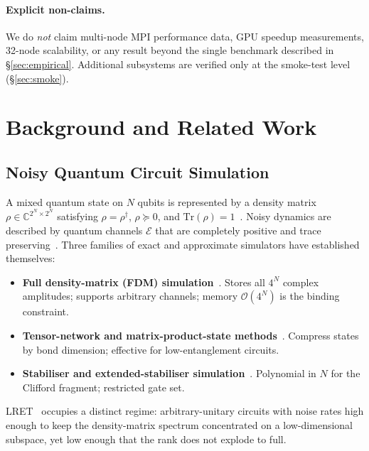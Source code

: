\documentclass[11pt,a4paper]{article}
\begin{document}
\paragraph{Explicit non-claims.}
We do \emph{not} claim multi-node MPI performance data, GPU speedup measurements,
32-node scalability, or any result beyond the single benchmark described in
\S\ref{sec:empirical}. Additional subsystems are verified only at the smoke-test level
(\S\ref{sec:smoke}).

\section{Background and Related Work}
\label{sec:background}

\subsection{Noisy Quantum Circuit Simulation}
\label{sec:bg-sim}

A mixed quantum state on $N$ qubits is represented by a density matrix
$\rho \in \mathbb{C}^{2^N \times 2^N}$ satisfying $\rho = \rho^\dagger$, $\rho \succeq 0$,
and $\mathrm{Tr}(\rho) = 1$~\cite{nielsenchuang2010}. Noisy dynamics are described by
quantum channels $\mathcal{E}$ that are completely positive and trace
preserving~\cite{choi1975,kraus1983}. Three families of exact and approximate
simulators have established themselves:

\begin{itemize}
  \item \textbf{Full density-matrix (FDM) simulation}~\cite{jones2019quest,cirq}.
        Stores all $4^N$ complex amplitudes; supports arbitrary channels; memory
        $\mathcal{O}(4^N)$ is the binding constraint.
  \item \textbf{Tensor-network and matrix-product-state methods}~\cite{orus2014tn,
        schollwock2011dmrg}. Compress states by bond dimension; effective for
        low-entanglement circuits.
  \item \textbf{Stabiliser and extended-stabiliser simulation}~\cite{gottesman1997,
        aaronson2004chpf}. Polynomial in $N$ for the Clifford fragment; restricted gate
        set.
\end{itemize}

LRET~\cite{chen2021lret} occupies a distinct regime: arbitrary-unitary circuits with
noise rates high enough to keep the density-matrix spectrum concentrated on a
low-dimensional subspace, yet low enough that the rank does not explode to full.
\end{document}
